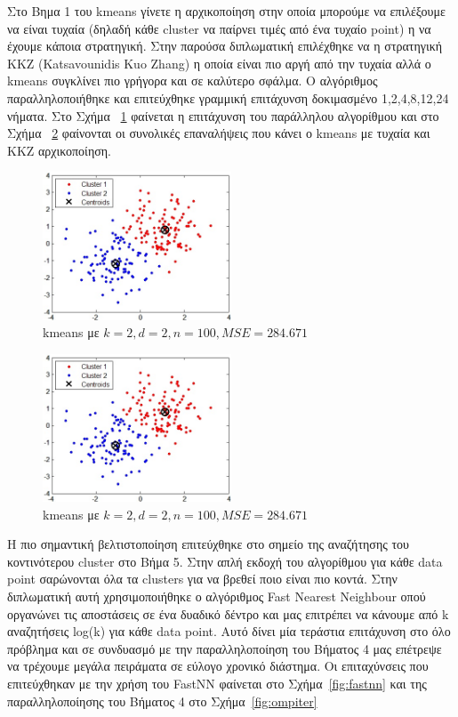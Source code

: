 \newpage

\indent Στο Βημα 1 του kmeans γίνετε η αρχικοποίηση στην οποία μπορούμε να επιλέξουμε να είναι τυχαία (δηλαδή κάθε cluster να παίρνει τιμές από ένα τυχαίο point) η να έχουμε κάποια στρατηγική. Στην παρούσα διπλωματική επιλέχθηκε να η στρατηγική KKZ (Katsavounidis Kuo Zhang) η οποία είναι πιο αργή από την τυχαία αλλά ο kmeans συγκλίνει πιο γρήγορα και σε καλύτερο σφάλμα. Ο αλγόριθμος παραλληλοποιήθηκε και επιτεύχθηκε γραμμική επιτάχυνση δοκιμασμένο 1,2,4,8,12,24 νήματα. Στο Σχήμα ~\ref{fig:kkzspeed} φαίνεται η επιτάχυνση του παράλληλου αλγορίθμου και στο Σχήμα ~\ref{fig:kkziter} φαίνονται οι συνολικές επαναλήψεις που κάνει ο kmeans με τυχαία και KKZ αρχικοποίηση.

\begin{figure}[ht!]
  \centering
  \includegraphics[width=0.5\textwidth]{chapter3/kmeans.jpg}
  \caption{kmeans με $k=2,d=2,n=100,MSE=284.671$}
  \label{fig:kkzspeed}
\end{figure}

\begin{figure}[ht!]
  \centering
  \includegraphics[width=0.5\textwidth]{chapter3/kmeans.jpg}
  \caption{kmeans με $k=2,d=2,n=100,MSE=284.671$}
  \label{fig:kkziter}
\end{figure}

\newpage

\indent Η πιο σημαντική βελτιστοποίηση επιτεύχθηκε στο σημείο της αναζήτησης του κοντινότερου cluster στο Βήμα 5. Στην απλή εκδοχή του αλγορίθμου για κάθε data point σαρώνονται όλα τα clusters για να βρεθεί ποιο είναι πιο κοντά. Στην διπλωματική αυτή χρησιμοποιήθηκε ο αλγόριθμος Fast Nearest Neighbour οπού οργανώνει τις αποστάσεις σε ένα δυαδικό δέντρο και μας επιτρέπει να κάνουμε από k αναζητήσεις log(k) για κάθε data point. Αυτό δίνει μία τεράστια επιτάχυνση στο όλο πρόβλημα και σε συνδυασμό με την παραλληλοποίηση του Βήματος 4 μας επέτρεψε να τρέχουμε μεγάλα πειράματα σε εύλογο χρονικό διάστημα. Οι επιταχύνσεις που επιτεύχθηκαν με την χρήση του FastNN φαίνεται στο Σχήμα~\ref{fig:fastnn} και της παραλληλοποίησης του Βήματος 4 στο Σχήμα~\ref{fig:ompiter}

